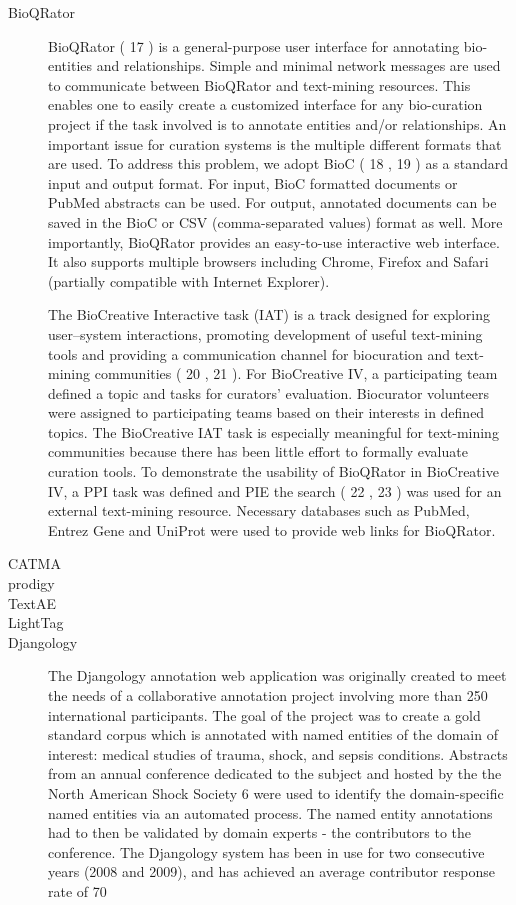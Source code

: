 \begin{description}
    \item[BioQRator]
    BioQRator ( 17 ) is a general-purpose user interface for annotating bio-entities and relationships. Simple and minimal network messages are used to communicate between BioQRator and text-mining resources. This enables one to easily create a customized interface for any bio-curation project if the task involved is to annotate entities and/or relationships. An important issue for curation systems is the multiple different formats that are used. To address this problem, we adopt BioC ( 18 , 19 ) as a standard input and output format. For input, BioC formatted documents or PubMed abstracts can be used. For output, annotated documents can be saved in the BioC or CSV (comma-separated values) format as well. More importantly, BioQRator provides an easy-to-use interactive web interface. It also supports multiple browsers including Chrome, Firefox and Safari (partially compatible with Internet Explorer).

    The BioCreative Interactive task (IAT) is a track designed for exploring user–system interactions, promoting development of useful text-mining tools and providing a communication channel for biocuration and text-mining communities ( 20 , 21 ). For BioCreative IV, a participating team defined a topic and tasks for curators’ evaluation. Biocurator volunteers were assigned to participating teams based on their interests in defined topics. The BioCreative IAT task is especially meaningful for text-mining communities because there has been little effort to formally evaluate curation tools. To demonstrate the usability of BioQRator in BioCreative IV, a PPI task was defined and PIE the search ( 22 , 23 ) was used for an external text-mining resource. Necessary databases such as PubMed, Entrez Gene and UniProt were used to provide web links for BioQRator.
    
    \item[CATMA]
    
    
    \item[prodigy]
    
    
    \item[TextAE]
    
    
    \item[LightTag]
    
    
    \item[Djangology]
    The Djangology
    annotation web application was originally created to meet the needs of a collaborative annotation
    project involving more than 250 international participants.
    The goal of the project was to create a gold standard corpus
    which is annotated with named entities of the domain
    of interest: medical studies of trauma, shock, and sepsis
    conditions. Abstracts from an annual conference dedicated
    to the subject and hosted by the the North American
    Shock Society 6 were used to identify the domain-specific
    named entities via an automated process. The named entity
    annotations had to then be validated by domain experts -
    the contributors to the conference. The Djangology system
    has been in use for two consecutive years (2008 and 2009),
    and has achieved an average contributor response rate of
    70%


\end{description}
